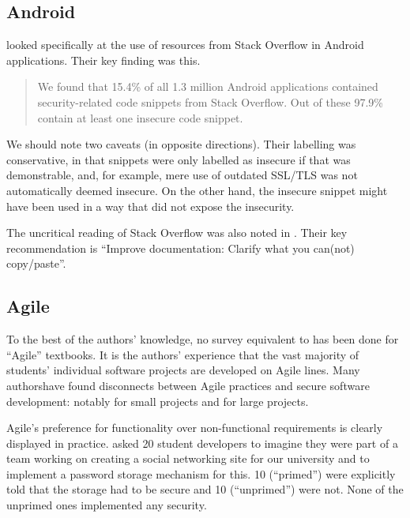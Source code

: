 \documentclass[conference]{IEEEtran}
\begin{document}
\subsection{Android}\label{sec:Android}
\cite{Fischeretal2017a} looked specifically at the use of resources from Stack Overflow in Android applications. Their key finding was this.
\begin{quote}
We found that 15.4\% of all 1.3 million Android applications
contained security-related code snippets from
Stack Overflow. Out of these 97.9\% contain at least one
insecure code snippet.
\end{quote}
We should note two caveats (in opposite directions). Their labelling was conservative, in that snippets were only labelled as insecure if that was demonstrable, and, for example, mere use of outdated SSL/TLS was not automatically deemed insecure. On the other hand, the insecure snippet might have been used in a way that did not expose the insecurity.
\par
The uncritical reading of Stack Overflow was also noted in \cite[Slide 29]{Votipkaetal2019a}. Their key recommendation  \cite[Slide 32]{Votipkaetal2019a} is ``Improve documentation: Clarify what you can(not) copy/paste''. 
\subsection{Agile}
To the best of the authors' knowledge, no survey equivalent to \cite{Drop2019} has been done for ``Agile'' textbooks. It is the authors' experience that the vast majority of students' individual software projects are developed on Agile lines. Many authorshave found disconnects between Agile practices and secure software development: notably \cite{Bartsch2011a} for small projects and \cite{vanderHeijden:2018:EPS:3239235.3267426} for large projects.
\par
Agile's preference for functionality over non-functional requirements is clearly displayed in practice. \cite{Naiakshinaetal2017a} asked 20 student developers to imagine they
were part of a team working on creating a social networking site for
our university and to implement a password storage mechanism for this. 10 (``primed'') were explicitly told that the storage had to be secure and 10 (``unprimed'') were not. None of the unprimed ones implemented any security.
\end{document}
